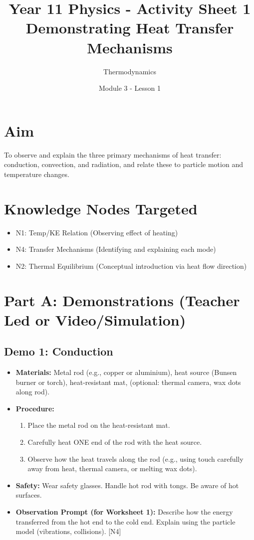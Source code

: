 \documentclass[11pt, a4paper]{article} %
\title{Year 11 Physics - Activity Sheet 1 \\ Demonstrating Heat Transfer Mechanisms}
\date{Module 3 - Lesson 1}
\author{Thermodynamics}
\begin{document}
\maketitle

\section*{Aim}
To observe and explain the three primary mechanisms of heat transfer: conduction, convection, and radiation, and relate these to particle motion and temperature changes.

\section*{Knowledge Nodes Targeted}
\begin{itemize}
    \item N1: Temp/KE Relation (Observing effect of heating)
    \item N4: Transfer Mechanisms (Identifying and explaining each mode)
    \item N2: Thermal Equilibrium (Conceptual introduction via heat flow direction)
\end{itemize}

\section*{Part A: Demonstrations (Teacher Led or Video/Simulation)}

\subsection*{Demo 1: Conduction}
\begin{itemize}
    \item \textbf{Materials:} Metal rod (e.g., copper or aluminium), heat source (Bunsen burner or torch), heat-resistant mat, (optional: thermal camera, wax dots along rod).
    \item \textbf{Procedure:}
        \begin{enumerate}
        \item Place the metal rod on the heat-resistant mat.
        \item Carefully heat ONE end of the rod with the heat source.
        \item Observe how the heat travels along the rod (e.g., using touch carefully away from heat, thermal camera, or melting wax dots).
        \end{enumerate}
    \item \textbf{Safety:} Wear safety glasses. Handle hot rod with tongs. Be aware of hot surfaces.
    \item \textbf{Observation Prompt (for Worksheet 1):} Describe how the energy transferred from the hot end to the cold end. Explain using the particle model (vibrations, collisions). [N4]
\end{itemize}
\end{document}

